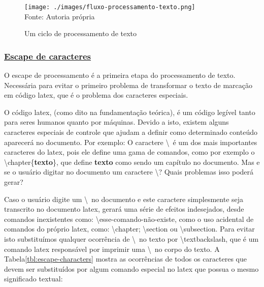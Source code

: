 \begin{figure}[H]
    \centering
    \caption{Um ciclo de processamento de texto}
    \texttt{[image: ./images/fluxo-processamento-texto.png]}
    \label{fig:fluxo-processamento-texto} \\
    \textnormal{\fontsize{10pt}{12pt}Fonte: Autoria própria}
\end{figure}



\subsubsection{\underline{Escape de caracteres}}

O escape de processamento é a primeira etapa do processamento
de texto. Necessária para evitar o primeiro problema de transformar
o texto de marcação em código
\acrshort{latex},
que é o problema dos caracteres especiais.

O código
\acrshort{latex},
(como dito na fundamentação teórica),
é um código legível tanto para seres humanos
quanto por máquinas. Devido a isto, existem alguns caracteres
especiais de controle que ajudam a definir como
determinado conteúdo aparecerá no documento. Por exemplo:
O caractere \textbackslash~é  um dos mais importantes caracteres do
\acrshort{latex},
pois ele
define uma gama de comandos, como por exemplo o \textbackslash chapter\{\textbf{texto}\},
que define
\textbf{texto}
como sendo um capítulo no documento.
Mas e se o usuário digitar no documento um caractere \textbackslash ?
Quais problemas isso poderá gerar?

Caso o usuário digite um \textbackslash~no documento e este caractere simplesmente seja
transcrito no documento
\acrshort{latex},
gerará uma série de efeitos indesejados, desde
comandos inexistentes como: \textbackslash esse-comando-não-existe,
como o uso acidental de comandos do próprio
\acrshort{latex},
como:
\textbackslash chapter; \textbackslash section ou \textbackslash subsection.
Para evitar isto substituímos qualquer ocorrência de
\textbackslash~no texto por \textbackslash textbackslash, que é um comando
\acrshort{latex}
responsável por imprimir uma \textbackslash~no corpo
do texto.
A
Tabela\ref{tbl:escape-characters}
mostra as ocorrências de todos os caracteres que devem ser substituídos
por algum comando especial no
\acrshort{latex}
que possua o mesmo significado textual:

